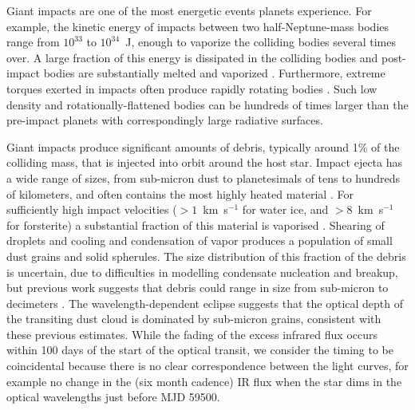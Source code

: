 \documentclass[sn-nature]{sn-jnl}%
\begin{document}
Giant impacts are one of the most energetic events planets experience.
%
For example, the kinetic energy of impacts between two half-Neptune-mass bodies range from $10^{33}$ to $10^{34}$~J, enough to vaporize the colliding bodies several times over.
%
A large fraction of this energy is dissipated in the colliding bodies and post-impact bodies are substantially melted and vaporized \cite{Nakajima2015,Lock2017,Carter2020}.
%
Furthermore, extreme torques exerted in impacts often produce rapidly rotating bodies \cite{Lock2017}.
%
Such low density and rotationally-flattened bodies can be hundreds of times larger than the pre-impact planets \cite{Lock2017} with correspondingly large radiative surfaces.


Giant impacts produce significant amounts of debris, typically around 1\% of the colliding mass, that is injected into orbit around the host star\cite{Canup2001,Lock18}.
%
Impact ejecta has a wide range of sizes, from sub-micron dust to planetesimals of tens to hundreds of kilometers, and often contains the most highly heated material \cite{Benz2008_Mercury_book,Leinhardt2015,Carter2020a}.
%
For sufficiently high impact velocities ($>1$~km~s$^{-1}$ for water ice, and $>8$~km~s$^{-1}$ for forsterite) a substantial fraction of this material is vaporised \cite{Stewart2008,Davies2020,Carter2020a}.
%
Shearing of droplets and cooling and condensation of vapor produces a population of small dust grains and solid spherules.
%
The size distribution of this fraction of the debris is uncertain, due to difficulties in modelling condensate nucleation and breakup, but previous work suggests that debris could range in size from sub-micron to decimeters \cite{Benz2008_Mercury_book,Johnson2015}.
%
The wavelength-dependent eclipse suggests that the optical depth of the transiting dust cloud is dominated by sub-micron grains, consistent with these previous estimates.
%
While the fading of the excess infrared flux occurs within 100 days of the start of the optical transit, we consider the timing to be coincidental because there is no clear correspondence between the light curves, for example no  change in the (six month cadence) IR flux when the star dims in the optical wavelengths just before MJD 59500.

\end{document}
